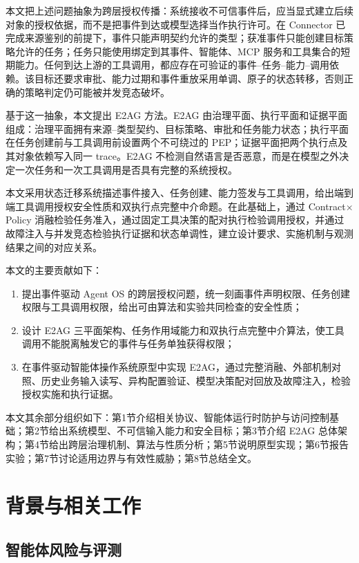 本文把上述问题抽象为跨层授权传播：系统接收不可信事件后，应当显式建立后续对象的授权依据，而不是把事件到达或模型选择当作执行许可。在 Connector 已完成来源鉴别的前提下，事件只能声明契约允许的类型；获准事件只能创建目标策略允许的任务；任务只能使用绑定到其事件、智能体、MCP 服务和工具集合的短期能力。任何到达上游的工具调用，都应存在可验证的事件--任务--能力--调用依赖。该目标还要求审批、能力过期和事件重放采用单调、原子的状态转移，否则正确的策略判定仍可能被并发竞态破坏。

基于这一抽象，本文提出 E2AG 方法。E2AG 由治理平面、执行平面和证据平面组成：治理平面拥有来源--类型契约、目标策略、审批和任务能力状态；执行平面在任务创建前与工具调用前设置两个不可绕过的 PEP；证据平面把两个执行点及其对象依赖写入同一 trace。E2AG 不检测自然语言是否恶意，而是在模型之外决定一次任务和一次工具调用是否具有完整的系统授权。

本文采用状态迁移系统描述事件接入、任务创建、能力签发与工具调用，给出端到端工具调用授权安全性质和双执行点完整中介命题。在此基础上，通过 Contract$\times$Policy 消融检验任务准入，通过固定工具决策的配对执行检验调用授权，并通过故障注入与并发竞态检验执行证据和状态单调性，建立设计要求、实施机制与观测结果之间的对应关系。

本文的主要贡献如下：
\begin{enumerate}
  \item 提出事件驱动 Agent OS 的跨层授权问题，统一刻画事件声明权限、任务创建权限与工具调用权限，给出可由算法和实验共同检查的安全性质；
  \item 设计 E2AG 三平面架构、任务作用域能力和双执行点完整中介算法，使工具调用不能脱离触发它的事件与任务单独获得权限；
  \item 在事件驱动智能体操作系统原型中实现 E2AG，通过完整消融、外部机制对照、历史业务输入读写、异构配置验证、模型决策配对回放及故障注入，检验授权实施和执行证据。
\end{enumerate}

本文其余部分组织如下：第1节介绍相关协议、智能体运行时防护与访问控制基础；第2节给出系统模型、不可信输入能力和安全目标；第3节介绍 E2AG 总体架构；第4节给出跨层治理机制、算法与性质分析；第5节说明原型实现；第6节报告实验；第7节讨论适用边界与有效性威胁；第8节总结全文。

\section{背景与相关工作}\label{sec:related-v11}

\subsection{智能体风险与评测}

